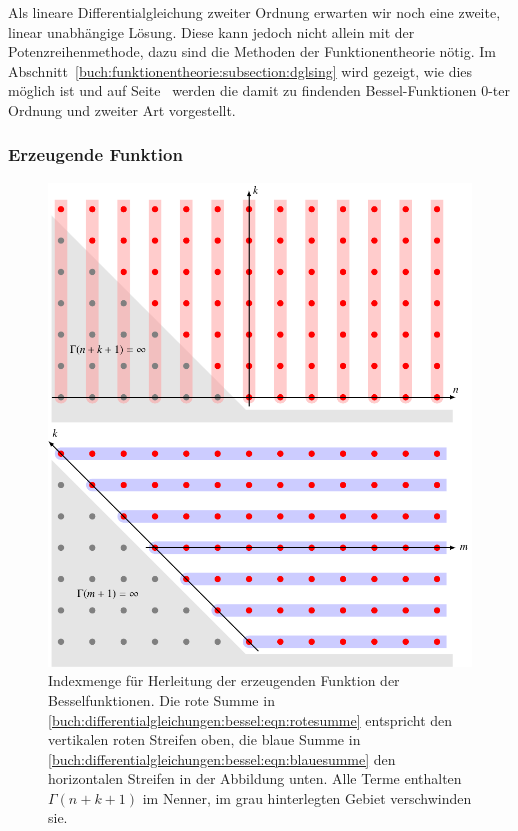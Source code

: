 Als lineare Differentialgleichung zweiter Ordnung erwarten wir noch
eine zweite, linear unabhängige Lösung.
Diese kann jedoch nicht allein mit der Potenzreihenmethode,
dazu sind die Methoden der Funktionentheorie nötig.
Im Abschnitt~\ref{buch:funktionentheorie:subsection:dglsing}
wird gezeigt, wie dies möglich ist und auf
Seite~\pageref{buch:funktionentheorie:subsubsection:bessel2art}
werden die damit zu findenden Bessel-Funktionen 0-ter Ordnung und
zweiter Art vorgestellt.

%
%
\subsubsection{Erzeugende Funktion}
\begin{figure}
\centering
\includegraphics{chapters/050-differential/images/besselgrid.pdf}
\caption{Indexmenge für Herleitung der erzeugenden Funktion der
Besselfunktionen.
Die rote Summe in \eqref{buch:differentialgleichungen:bessel:eqn:rotesumme}
entspricht den vertikalen roten Streifen oben,
die blaue Summe in
\eqref{buch:differentialgleichungen:bessel:eqn:blauesumme}
den horizontalen Streifen in der Abbildung unten.
Alle Terme enthalten $\Gamma(n+k+1)$ im Nenner,
im grau hinterlegten Gebiet verschwinden sie.
\label{buch:differentialgleichungen:bessel:fig:indexmenge}}
\end{figure}
